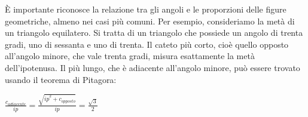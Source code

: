 È importante riconosce la relazione tra gli angoli e le proporzioni delle figure geometriche, almeno nei casi più comuni.\newline
Per esempio, consideriamo la metà di un triangolo equilatero. Si tratta di un triangolo che possiede un angolo di trenta gradi, uno di sessanta e uno di trenta.\newline
Il cateto più corto, cioè quello opposto all'angolo minore, che vale trenta gradi, misura esattamente la metà dell'ipotenusa.\newline
Il più lungo, che è adiacente all'angolo minore, può essere trovato usando il teorema di Pitagora:
\begin{center}
\begin{math}
\frac {c_{adiacente}} {ip}=\frac {\sqrt{{ip}^2 + c_{opposto}}} {ip} = \frac {\sqrt{3}} 2
\end{math}
\end{center}

